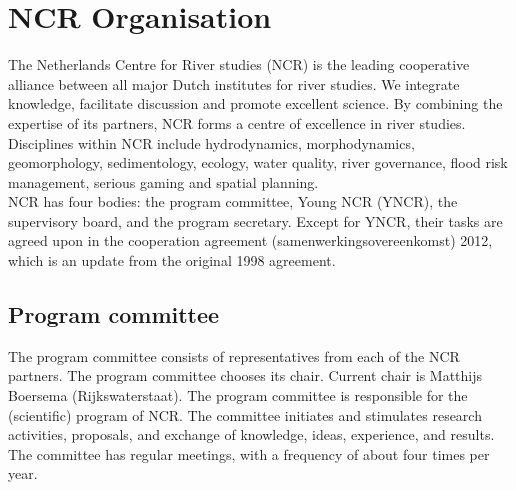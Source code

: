 \chapter{NCR Organisation}
The Netherlands Centre for River studies (NCR) is the leading cooperative alliance between all major Dutch institutes for river studies. We integrate knowledge, facilitate discussion and promote excellent science. By combining the expertise of its partners, NCR forms a centre of excellence in river studies. Disciplines within NCR include hydrodynamics, morphodynamics, geomorphology, sedimentology, ecology, water quality, river governance, flood risk management, serious gaming and spatial planning.\\

NCR has four bodies: the program committee, Young NCR (YNCR), the supervisory board, and the program secretary. Except for YNCR, their tasks are agreed upon in the cooperation agreement (samenwerkingsovereenkomst) 2012, which is an update from the original 1998 agreement.\\
    
    \section{Program committee}
    The program committee consists of representatives from each of the NCR partners. The program committee chooses its chair. Current chair is Matthijs Boersema (Rijkswaterstaat). The program committee is responsible for the (scientific) program of NCR. The committee initiates and stimulates research activities, proposals, and exchange of knowledge, ideas, experience, and results. The committee has regular meetings, with a frequency of about four times per year.\\ 
    
